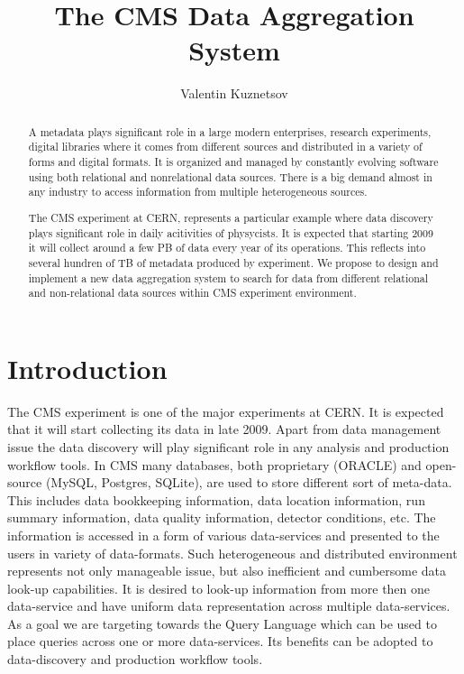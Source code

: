\documentclass[a4paper]{jpconf}
\begin{document}
\title{The CMS Data Aggregation System}

\author{Valentin Kuznetsov}
\address{Cornell University, Ithaca, New York, USA}

\begin{abstract}
A metadata plays significant role in a large modern enterprises, research experiments,
digital libraries where it comes from different sources and distributed in a 
variety of forms and digital formats. It is organized and managed by constantly
evolving software using both relational and nonrelational data sources. There is
a big demand almost in any industry to access information from multiple 
heterogeneous sources.

The CMS experiment at CERN, represents a particular example where data discovery
plays significant role in daily acitivities of physycists. 
It is expected that starting 2009 it will collect around a few PB of data every 
year of its operations. This reflects into
several hundren of TB of metadata produced by experiment. 
We propose to design and implement a new data aggregation system to search for
data from different relational and non-relational data sources within CMS
experiment environment.
\end{abstract}

\newpage

\section{Introduction}
The CMS experiment is one of the major experiments at CERN. It is expected
that it will start collecting its data in late 2009. Apart from data management
issue the data discovery will play significant role in any analysis and
production workflow tools. In CMS many databases, both
proprietary (ORACLE) and open-source (MySQL, Postgres, SQLite), are used
to store different sort of meta-data. This includes data bookkeeping information,
data location information, run summary information, data quality information,
detector conditions, etc. The information is accessed in a form of
various data-services and presented to the users in variety of data-formats.
Such heterogeneous and distributed environment represents not only manageable
issue, but also inefficient and cumbersome data look-up capabilities. It is desired
to look-up information from more then one data-service and have uniform data
representation across multiple data-services. As a goal we are targeting
towards the Query Language which can be used to place queries across
one or more data-services. Its benefits can be adopted to data-discovery and
production workflow tools.
\end{document}
